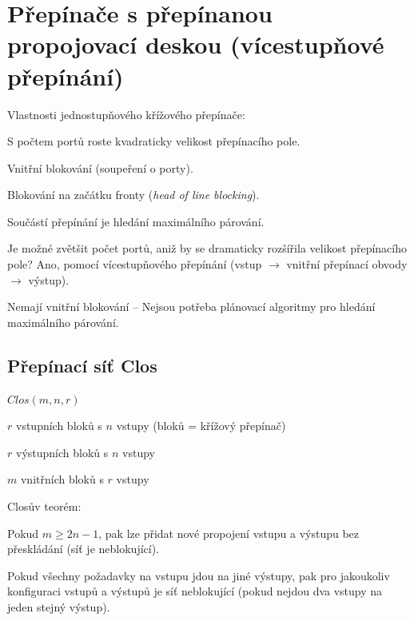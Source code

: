 \section{Přepínače s přepínanou propojovací deskou (vícestupňové přepínání)}

Vlastnosti jednostupňového křížového přepínače:
\begin{compactitem}
    \item S počtem portů roste kvadraticky velikost přepínacího pole.
    \item Vnitřní blokování (soupeření o porty).
    \item Blokování na začátku fronty (\textit{head of line blocking}).
    \item Součástí přepínání je hledání maximálního párování.
\end{compactitem}

\noindent Je možné zvětšit počet portů, aniž by se dramaticky rozšířila velikost přepínacího pole? Ano, pomocí vícestupňového přepínání (vstup $\rightarrow$ vnitřní přepínací obvody $\rightarrow$ výstup).
\begin{compactitem}
    \item Nemají vnitřní blokování -- Nejsou potřeba plánovací algoritmy pro hledání maximálního párování.
\end{compactitem}

\subsection{Přepínací síť Clos}

$Clos(m, n, r)$
\begin{compactitem}
    \item $r$ vstupních bloků s $n$ vstupy (bloků = křížový přepínač)
    \item $r$ výstupních bloků s $n$ vstupy
    \item $m$ vnitřních bloků s $r$ vstupy
\end{compactitem}

\noindent Closův teorém: \begin{compactitem}
    \item Pokud $m \geq 2n - 1$, pak lze přidat nové propojení vstupu a výstupu bez přeskládání (síť je neblokující). \begin{compactitem}
        \item Pokud všechny požadavky na vstupu jdou na jiné výstupy, pak pro jakoukoliv konfiguraci vstupů a výstupů je síť neblokující (pokud nejdou dva vstupy na jeden stejný výstup).
    \end{compactitem}
\end{compactitem}

